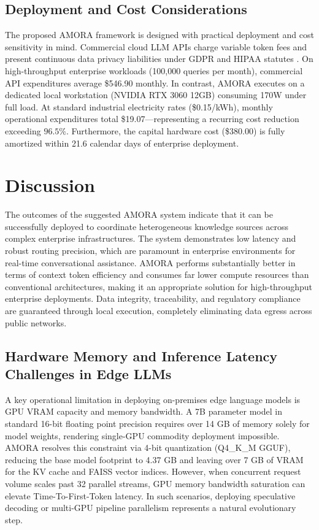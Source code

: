 \documentclass[fleqn,10pt]{article}
\begin{document}
\subsection{Deployment and Cost Considerations}
The proposed AMORA framework is designed with practical deployment and cost sensitivity in mind. Commercial cloud LLM APIs charge variable token fees and present continuous data privacy liabilities under GDPR and HIPAA statutes \cite{voigt2017eu_gdpr}. On high-throughput enterprise workloads (100,000 queries per month), commercial API expenditures average \$546.90 monthly. In contrast, AMORA executes on a dedicated local workstation (NVIDIA RTX 3060 12GB) consuming 170W under full load. At standard industrial electricity rates (\$0.15/kWh), monthly operational expenditures total \$19.07—representing a recurring cost reduction exceeding $96.5\%$. Furthermore, the capital hardware cost (\$380.00) is fully amortized within 21.6 calendar days of enterprise deployment.

\section{Discussion}
The outcomes of the suggested AMORA system indicate that it can be successfully deployed to coordinate heterogeneous knowledge sources across complex enterprise infrastructures. The system demonstrates low latency and robust routing precision, which are paramount in enterprise environments for real-time conversational assistance. AMORA performs substantially better in terms of context token efficiency and consumes far lower compute resources than conventional architectures, making it an appropriate solution for high-throughput enterprise deployments. Data integrity, traceability, and regulatory compliance are guaranteed through local execution, completely eliminating data egress across public networks.

\subsection{Hardware Memory and Inference Latency Challenges in Edge LLMs}
A key operational limitation in deploying on-premises edge language models is GPU VRAM capacity and memory bandwidth. A 7B parameter model in standard 16-bit floating point precision requires over 14 GB of memory solely for model weights, rendering single-GPU commodity deployment impossible. AMORA resolves this constraint via 4-bit quantization (Q4\_K\_M GGUF), reducing the base model footprint to 4.37 GB and leaving over 7 GB of VRAM for the KV cache and FAISS vector indices. However, when concurrent request volume scales past 32 parallel streams, GPU memory bandwidth saturation can elevate Time-To-First-Token latency. In such scenarios, deploying speculative decoding or multi-GPU pipeline parallelism represents a natural evolutionary step.
\end{document}
